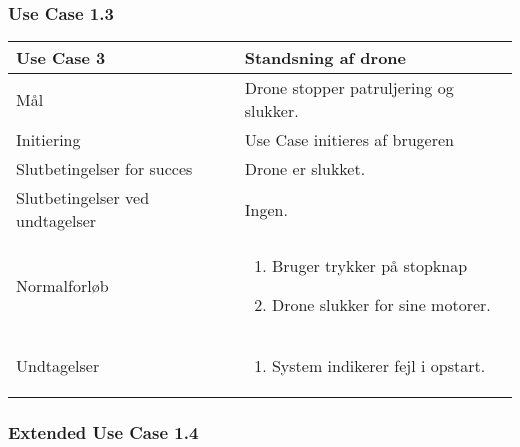 \documentclass[Main]{subfiles}
\begin{document}
	

	
\subsubsection{Use Case 1.3}

\begin{longtable}{|p{}|p{}|}
\hline
Use Case 3 	& 
Standsning af drone \\ \hline

Mål 		& 
Drone stopper patruljering og slukker. \\ \hline

Initiering	& 
Use Case initieres af brugeren \\ \hline

Slutbetingelser for succes & 
Drone er slukket.  \\ \hline

Slutbetingelser ved undtagelser & 
Ingen. \\ \hline

Normalforløb &	\vspace{-8mm}
	\begin{enumerate}
	\item Bruger trykker på stopknap
	\item Drone slukker for sine motorer.
	\end{enumerate} \\ \hline

Undtagelser & \vspace{-8mm}
	\begin{enumerate}
	\item System indikerer fejl i opstart.
	\end{enumerate} \\

\hline
\end{longtable}

	
	
\subsubsection{Extended Use Case 1.4}\label{UC:extend}
\end{document}
